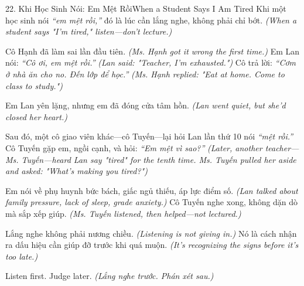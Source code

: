 \begin{truyen}{22. Khi Học Sinh Nói: Em Mệt Rồi}{When a Student Says I Am Tired}
Khi một học sinh nói \textit{``em mệt rồi,''} đó là lúc cần lắng nghe, không phải chỉ bớt.
\textit{(When a student says "I'm tired," listen—don't lecture.)}

Cô Hạnh đã làm sai lần đầu tiên.
\textit{(Ms. Hạnh got it wrong the first time.)}
Em Lan nói: \textit{``Cô ơi, em mệt rồi.''}
\textit{(Lan said: "Teacher, I'm exhausted.")}
Cô trả lời: \textit{``Cơm ở nhà ăn cho no. Đến lớp để học.''}
\textit{(Ms. Hạnh replied: "Eat at home. Come to class to study.")}

Em Lan yên lặng, nhưng em đã đóng cửa tâm hồn.
\textit{(Lan went quiet, but she'd closed her heart.)}

Sau đó, một cô giao viên khác—cô Tuyến—lại hỏi Lan lần thứ 10 nói \textit{``mệt rồi.''} Cô Tuyến gặp em, ngồi cạnh, và hỏi: \textit{``Em mệt vì sao?''}
\textit{(Later, another teacher—Ms. Tuyến—heard Lan say "tired" for the tenth time. Ms. Tuyến pulled her aside and asked: "What's making you tired?")}

Em nói về phụ huynh bức bách, giấc ngủ thiếu, áp lực điểm số.
\textit{(Lan talked about family pressure, lack of sleep, grade anxiety.)}
Cô Tuyến nghe xong, không dặn dò mà sắp xếp giúp.
\textit{(Ms. Tuyến listened, then helped—not lectured.)}

Lắng nghe không phải nương chiều.
\textit{(Listening is not giving in.)}
Nó là cách nhận ra dấu hiệu cần giúp đỡ trước khi quá muộn.
\textit{(It's recognizing the signs before it's too late.)}
\end{truyen}

\begin{baihoc}
Listen first. Judge later.
\textit{(Lắng nghe trước. Phán xét sau.)}
\end{baihoc}


